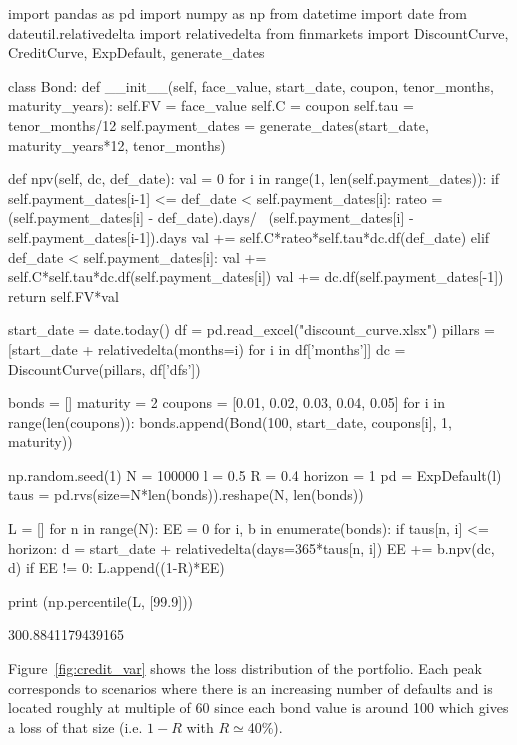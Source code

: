 \begin{ipython}
import pandas as pd
import numpy as np
from datetime import date
from dateutil.relativedelta import relativedelta
from finmarkets import DiscountCurve, CreditCurve, ExpDefault, generate_dates

class Bond:
  def __init__(self, face_value, start_date, coupon, tenor_months, maturity_years):
    self.FV = face_value
    self.C = coupon
    self.tau = tenor_months/12
    self.payment_dates = generate_dates(start_date, maturity_years*12, tenor_months)

  def npv(self, dc, def_date):
    val = 0
    for i in range(1, len(self.payment_dates)):
      if self.payment_dates[i-1] <= def_date < self.payment_dates[i]:
        rateo = (self.payment_dates[i] - def_date).days/ \
                (self.payment_dates[i] - self.payment_dates[i-1]).days
        val += self.C*rateo*self.tau*dc.df(def_date)
      elif def_date < self.payment_dates[i]:  
        val += self.C*self.tau*dc.df(self.payment_dates[i])
    val += dc.df(self.payment_dates[-1])
    return self.FV*val
    
start_date = date.today()
df = pd.read_excel("discount_curve.xlsx")
pillars = [start_date + relativedelta(months=i) for i in df['months']]
dc = DiscountCurve(pillars, df['dfs'])

bonds = []
maturity = 2
coupons = [0.01, 0.02, 0.03, 0.04, 0.05]
for i in range(len(coupons)):
    bonds.append(Bond(100, start_date, coupons[i], 1, maturity))

np.random.seed(1)
N = 100000
l = 0.5
R = 0.4
horizon = 1
pd = ExpDefault(l)
taus = pd.rvs(size=N*len(bonds)).reshape(N, len(bonds))

L = []
for n in range(N):
    EE = 0
    for i, b in enumerate(bonds):
        if taus[n, i] <= horizon:
            d = start_date + relativedelta(days=365*taus[n, i])
            EE += b.npv(dc, d)
    if EE != 0:
        L.append((1-R)*EE)
  
print (np.percentile(L, [99.9]))
\end{ipython}
\begin{ioutput}
300.8841179439165
\end{ioutput}
\noindent
Figure~\ref{fig:credit_var} shows the loss distribution of the portfolio. Each peak corresponds to scenarios where there is an increasing number of defaults and is located roughly at multiple of 60 since each bond value is around 100 which gives a loss of that size (i.e. $1-R$ with $R\simeq$40\%). 

